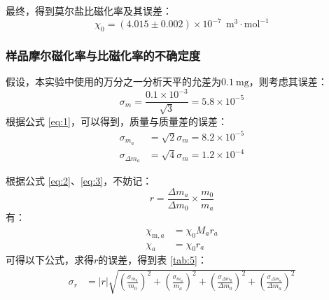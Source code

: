 \documentclass[cn,hazy,pku,12pt,normal,math=newtx,cite=super]{elegantnote}
\begin{document}
最终，得到莫尔盐比磁化率及其误差：
\begin{equation*}
\chi_0=(4.015  \pm 0.002)\times 10^{-7}\ \mathrm{~m^3\cdot mol^{-1}}
\end{equation*}

\subsubsection{样品摩尔磁化率与比磁化率的不确定度}

假设，本实验中使用的万分之一分析天平的允差为$0.1\mathrm{~mg}$，则考虑其误差：
\begin{equation*}
    \sigma_m = \frac{0.1\times 10^{-3}}{\sqrt{3}} = 5.8\times 10^{-5} 
\end{equation*}
根据公式 \eqref{eq:1}，可以得到，质量与质量差的误差：
\begin{align*}
    \sigma_{m_a} &= \sqrt{2}\sigma_m = 8.2\times 10^{-5}\\
    \sigma_{\Delta m_a} &= \sqrt{4}\sigma_m = 1.2\times 10^{-4} 
\end{align*}

根据公式 \eqref{eq:2}、\eqref{eq:3}，不妨记：
\begin{equation*}
    r = \frac{\Delta m_a}{\Delta m_0} \times \frac{m_0}{m_a}
\end{equation*}
有：
\begin{equation}\label{eq:6}
\begin{aligned}
    \chi_{\mathrm{m},a} &= \chi_0M_ar_a \\
    \chi_a &= \chi_0r_a 
\end{aligned}
\end{equation}
可得以下公式，求得$r$的误差，得到表 \ref{tab:5}：
\begin{equation*}
\begin{aligned}
    \sigma_r&=|r| \sqrt{\left(\frac{\sigma_{m_0}}{m_0}\right)^2+\left(\frac{\sigma_{m_a}}{m_a}\right)^2+\left(\frac{\sigma_{\Delta m_0}}{\Delta m_0}\right)^2+\left(\frac{\sigma_{\Delta m_a}}{\Delta m_a}\right)^2} \\
\end{aligned}
\end{equation*}
\end{document}
